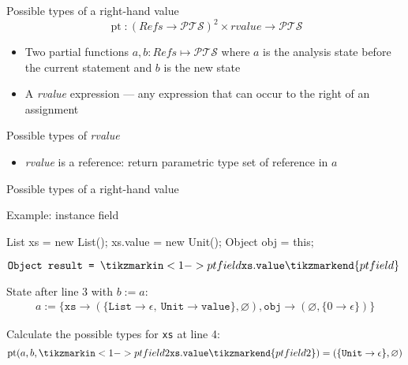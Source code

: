 \documentclass{beamer}
\begin{document}
\begin{frame}{Possible types of a right-hand value}
\[  \operatorname{pt} : (\mathit{Refs} \to \mathcal{PTS})^2 \times \mathit{rvalue} \to \mathcal{PTS} \]
\begin{itemize}
\item Two partial functions $a, b : \mathit{Refs} \mapsto \mathcal{PTS}$ where $a$ is the analysis state before the current statement and $b$ is the new state
\item A \emph{rvalue} expression --- any expression that can occur to the right of an assignment
\end{itemize}
\begin{block}{Possible types of \emph{rvalue}}
\begin{itemize}
\item \emph{rvalue} is a reference: return parametric type set of reference in $a$
\end{itemize}
\end{block}
\end{frame}

\begin{frame}[fragile]{Possible types of a right-hand value}
\begin{block}{Example: instance field}
\begin{javacode}
List xs = new List();
xs.value = new Unit();
Object obj = this;
\end{javacode}
\vspace{-4pt}
$\texttt{Object result = } \tikzmarkin<1->{ptfield}\mathtt{xs.value}\tikzmarkend{ptfield}$

\vspace{5pt}
State after line 3 with $b := a$: 
\begin{align*} a := \{\mathtt{xs} \to (\{\mathtt{List} \to \epsilon,\ \mathtt{Unit} \to \mathtt{value} \}, \varnothing), \mathtt{obj} \to (\varnothing, \{ 0 \to \epsilon \}) \}
\end{align*}

\vspace{5pt} \hline \vspace{5pt}
Calculate the possible types for \texttt{xs} at line 4:
    \[ \operatorname{pt}(a,b,\tikzmarkin<1->{ptfield2}\mathtt{xs.value}\tikzmarkend{ptfield2}) = (\{ \mathtt{Unit} \to \epsilon \}, \varnothing)\]
\end{block}
\end{frame}
\end{document}
